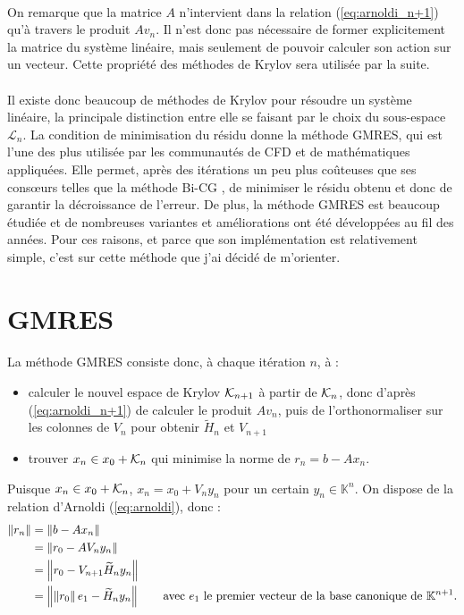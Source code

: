 	\paragraph{}
	On remarque que la matrice $A$ n'intervient dans la relation (\ref{eq:arnoldi_n+1}) qu'à travers le produit $Av_n$.
	Il n'est donc pas nécessaire de former explicitement la matrice du système linéaire, mais seulement de pouvoir calculer son action sur un vecteur.
	Cette propriété des méthodes de Krylov sera utilisée par la suite.

	\paragraph{}
	Il existe donc beaucoup de méthodes de Krylov pour résoudre un système linéaire, la principale distinction entre elle se faisant par le choix du sous-espace $\mathcal{L}_n$.
	La condition de minimisation du résidu donne la méthode GMRES, qui est l'une des plus utilisée par les communautés de CFD et de mathématiques appliquées.
	Elle permet, après des itérations un peu plus coûteuses que ses consœurs telles que la méthode Bi-CG \cite{TrefethenBau1997}, de minimiser le résidu obtenu et donc de garantir la décroissance de l'erreur.
	De plus, la méthode GMRES est beaucoup étudiée et de nombreuses variantes et améliorations ont été développées au fil des années.
	Pour ces raisons, et parce que son implémentation est relativement simple, c'est sur cette méthode que j'ai décidé de m'orienter.


\section{GMRES}

	\paragraph{}
	La méthode GMRES consiste donc, à chaque itération $n$, à :
	\begin{itemize}
		\item calculer le nouvel espace de Krylov $\krylov{n+1}$ à partir de $\krylov{n}$, donc d'après (\ref{eq:arnoldi_n+1}) de calculer le produit $Av_n$, puis de l'orthonormaliser sur les colonnes de $V_n$ pour obtenir $\widetilde{H}_n$ et $V_{n+1}$
		\item trouver $x_n \in x_0 + \krylov{n}$ qui minimise la norme de $r_n = b - Ax_n$.
	\end{itemize}
	Puisque $x_n \in x_0 + \krylov{n}$, $x_n = x_0 + V_n y_n$ pour un certain $y_n\in\mathbb{K}^n$.
	On dispose de la relation d'Arnoldi (\ref{eq:arnoldi}), donc :
	\begin{align*}
		\norm{r_n} &= \norm{b - Ax_n} \\
		&= \norm{r_0 - AV_ny_n} \\
		&= \norm{r_0 - V_{n+1}\widetilde{H}_ny_n} \\
		&= \norm{\norm{r_0} e_1 - \widetilde{H}_ny_n}\qquad\textrm{avec $e_1$ le premier vecteur de la base canonique de $\mathbb{K}^{n+1}$.}
	\end{align*}


